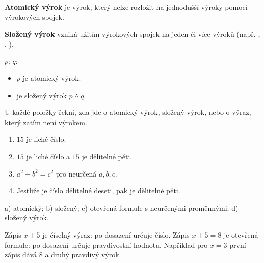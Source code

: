 \documentclass[11pt,a4paper]{article}
\begin{document}
\begin{definiceBox}[title={Definice - Atomický výrok}]
\textbf{Atomický výrok} je výrok, který nelze rozložit na jednodušší výroky pomocí výrokových spojek.
\end{definiceBox}

\begin{definiceBox}[title={Definice - Složený výrok}]
\textbf{Složený výrok} vzniká užitím výrokových spojek na jeden či více výroků (např. , , ).
\end{definiceBox}

\begin{prikladBox}[title={Příklad 2}]
$p$: \qquad $q$: 
\begin{itemize}
  \item $p$ je atomický výrok.
  \item {} je složený výrok $p\land q$.
\end{itemize}
\end{prikladBox}

\begin{zadaniReseniBox}[title={Samostatná práce 2}]
U každé položky řekni, zda jde o atomický výrok, složený výrok, nebo o výraz, který zatím není výrokem.
\begin{enumerate}[label=\alph*)]
  \item $15$ je liché číslo.
  \item $15$ je liché číslo a $15$ je dělitelné pěti.
  \item $a^2+b^2=c^2$ pro neurčená $a,b,c$.
  \item Jestliže je číslo dělitelné deseti, pak je dělitelné pěti.
\end{enumerate}
\tcblower
a) atomický; b) složený; c) otevřená formule s neurčenými proměnnými; d) složený výrok.
\end{zadaniReseniBox}

Zápis $x+5$ je číselný výraz: po dosazení určuje číslo.
Zápis $x+5=8$ je otevřená formule: po dosazení určuje pravdivostní
hodnotu. Například pro $x=3$ první zápis dává $8$ a druhý pravdivý výrok.
\end{document}
